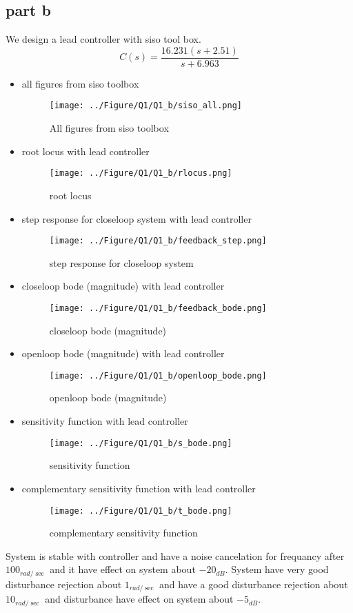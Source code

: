 \subsection{part b}
We design a lead controller with siso tool box.
$$
C(s) = \dfrac{16.231(s + 2.51)}{s + 6.963}
$$
\begin{itemize}
	\item all figures from siso toolbox
	\begin{figure}[H]
		\caption{All figures from siso toolbox}
		\centering
		\texttt{[image: ../Figure/Q1/Q1\_b/siso\_all.png]}
	\end{figure}
	\newpage
	\item root locus with lead controller
	\begin{figure}[H]
		\caption{root locus}
		\centering
		\texttt{[image: ../Figure/Q1/Q1\_b/rlocus.png]}
	\end{figure}
	\item step response for closeloop system with lead controller
	\begin{figure}[H]
		\caption{step response for closeloop system}
		\centering
		\texttt{[image: ../Figure/Q1/Q1\_b/feedback\_step.png]}
	\end{figure}
	\item closeloop bode (magnitude) with lead controller
	\begin{figure}[H]
		\caption{closeloop bode (magnitude)}
		\centering
		\texttt{[image: ../Figure/Q1/Q1\_b/feedback\_bode.png]}
	\end{figure}
	\item openloop bode (magnitude) with lead controller
	\begin{figure}[H]
		\caption{openloop bode (magnitude)}
		\centering
		\texttt{[image: ../Figure/Q1/Q1\_b/openloop\_bode.png]}
	\end{figure}
	\item sensitivity function with lead controller
	\begin{figure}[H]
		\caption{sensitivity function}
		\centering
		\texttt{[image: ../Figure/Q1/Q1\_b/s\_bode.png]}
	\end{figure}
	\item complementary sensitivity function with lead controller
	\begin{figure}[H]
		\caption{complementary sensitivity function}
		\centering
		\texttt{[image: ../Figure/Q1/Q1\_b/t\_bode.png]}
	\end{figure}
\end{itemize}
System is stable with controller and have a noise cancelation for frequancy after $100_{rad/{\sec}}$ and it have effect on system about $-20_{dB}$. System have very good disturbance rejection about $1_{rad/{\sec}}$ and have a good disturbance rejection about $10_{rad/{\sec}}$ and disturbance have effect on system about $-5_{dB}$. 

